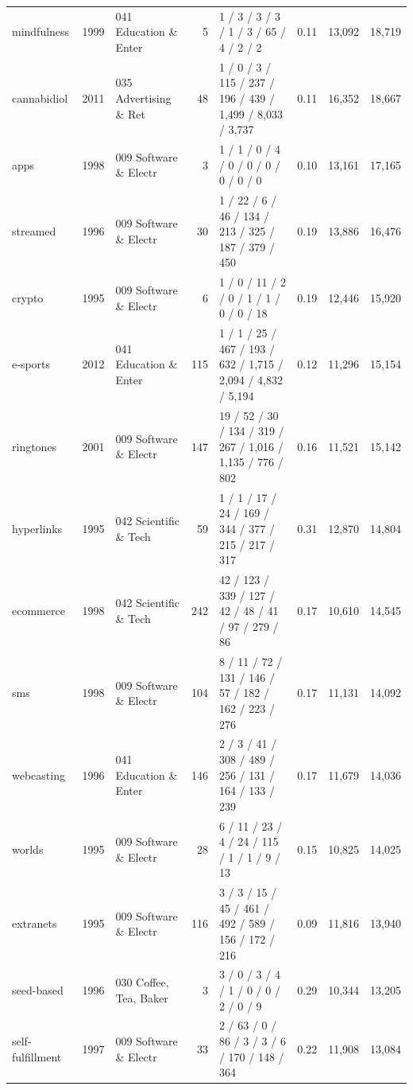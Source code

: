 \documentclass[11pt]{article}
\begin{document}
\begin{landscape}
{\begin{longtable}{@{}l c p{2.6cm} r p{6.2cm} r r r@{}}
mindfulness & 1999 & 041 Education \& Enter & 5 & \scriptsize{1 / 3 / 3 / 3 / 1 / 3 / 65 / 4 / 2 / 2} & 0.11 & 13,092 & 18,719 \\
cannabidiol & 2011 & 035 Advertising \& Ret & 48 & \scriptsize{1 / 0 / 3 / 115 / 237 / 196 / 439 / 1,499 / 8,033 / 3,737} & 0.11 & 16,352 & 18,667 \\
apps & 1998 & 009 Software \& Electr & 3 & \scriptsize{1 / 1 / 0 / 4 / 0 / 0 / 0 / 0 / 0 / 0} & 0.10 & 13,161 & 17,165 \\
streamed & 1996 & 009 Software \& Electr & 30 & \scriptsize{1 / 22 / 6 / 46 / 134 / 213 / 325 / 187 / 379 / 450} & 0.19 & 13,886 & 16,476 \\
crypto & 1995 & 009 Software \& Electr & 6 & \scriptsize{1 / 0 / 11 / 2 / 0 / 1 / 1 / 0 / 0 / 18} & 0.19 & 12,446 & 15,920 \\
e-sports & 2012 & 041 Education \& Enter & 115 & \scriptsize{1 / 1 / 25 / 467 / 193 / 632 / 1,715 / 2,094 / 4,832 / 5,194} & 0.12 & 11,296 & 15,154 \\
ringtones & 2001 & 009 Software \& Electr & 147 & \scriptsize{19 / 52 / 30 / 134 / 319 / 267 / 1,016 / 1,135 / 776 / 802} & 0.16 & 11,521 & 15,142 \\
hyperlinks & 1995 & 042 Scientific \& Tech & 59 & \scriptsize{1 / 1 / 17 / 24 / 169 / 344 / 377 / 215 / 217 / 317} & 0.31 & 12,870 & 14,804 \\
ecommerce & 1998 & 042 Scientific \& Tech & 242 & \scriptsize{42 / 123 / 339 / 127 / 42 / 48 / 41 / 97 / 279 / 86} & 0.17 & 10,610 & 14,545 \\
sms & 1998 & 009 Software \& Electr & 104 & \scriptsize{8 / 11 / 72 / 131 / 146 / 57 / 182 / 162 / 223 / 276} & 0.17 & 11,131 & 14,092 \\
webcasting & 1996 & 041 Education \& Enter & 146 & \scriptsize{2 / 3 / 41 / 308 / 489 / 256 / 131 / 164 / 133 / 239} & 0.17 & 11,679 & 14,036 \\
worlds & 1995 & 009 Software \& Electr & 28 & \scriptsize{6 / 11 / 23 / 4 / 24 / 115 / 1 / 1 / 9 / 13} & 0.15 & 10,825 & 14,025 \\
extranets & 1995 & 009 Software \& Electr & 116 & \scriptsize{3 / 3 / 15 / 45 / 461 / 492 / 589 / 156 / 172 / 216} & 0.09 & 11,816 & 13,940 \\
seed-based & 1996 & 030 Coffee, Tea, Baker & 3 & \scriptsize{3 / 0 / 3 / 4 / 1 / 0 / 0 / 2 / 0 / 9} & 0.29 & 10,344 & 13,205 \\
self-fulfillment & 1997 & 009 Software \& Electr & 33 & \scriptsize{2 / 63 / 0 / 86 / 3 / 3 / 6 / 170 / 148 / 364} & 0.22 & 11,908 & 13,084 \\

\end{longtable}}
\end{landscape}
\end{document}
